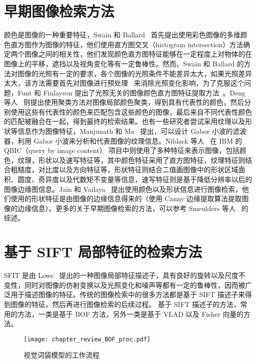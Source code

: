\section{早期图像检索方法}\label{sec:early_work_review}

颜色是图像的一种重要特征，Swain 和 Ballard~\cite{Swain1991ColorI} 首先提出使用彩色图像的多维颜色直方图作为图像的特征，他们使用直方图交叉（histogram intersection）方法确定两个图像之间的相关性，他们发现颜色直方图特征能够在一定程度上对物体的在图像上的平移，遮挡以及视角变化等有一定鲁棒性。然而，Swain 和 Ballard 的方法对图像的光照有一定的要求，各个图像的光照条件不能差异太大，如果光照差异太大，该方法需要首先对图像进行预处理~\cite{Forsyth1990ANA} 来消除光照变化影响，为了克服这个问题，Funt 和 Finlayson 提出了光照无关的图像颜色直方图特征提取方法~\cite{Funt1995ColorCC}。Deng 等人~\cite{Deng2001AnEC} 则提出使用聚类方法对图像局部颜色聚类，得到具有代表性的颜色，然后分别使用这些有代表性的颜色来匹配包含这些颜色的图像，最后来自不同代表性颜色的匹配被融合在一起，得到最终的检索结果。也有一些研究者尝试采用纹理以及形状等信息作为图像特征，Manjunath 和 Ma~\cite{Manjunath1996TextureFF} 提出，可以设计 Gabor 小波的滤波器，利用 Gabor 小波来分析和代表图像的纹理信息。Niblack 等人~\cite{Niblack1993TheQP} 在 IBM 的 QBIC（query by image content） 项目中则使用了多种特征来表示图像，包括颜色，纹理，形状以及速写特征等，其中颜色特征采用了直方图特征，纹理特征则结合粗糙度，对比度以及方向特征等，形状特征则结合二值画图像中的形状区域面积、圆度、奇异度以及代数矩不变量等信息，速写特征则是基于降低分辨率以后的图像边缘图信息。Jain 和 Vailaya~\cite{Jain1996ImageRU} 提出使用颜色以及形状信息进行图像检索，他们使用的形状特征是由图像的边缘信息得来的（使用 Canny 边缘提取算法提取图像的边缘信息）。更多的关于早期图像检索的方法，可以参考 Smeulders 等人~\cite{Smeulders2000ContentBasedIR} 的综述。


\section{基于 SIFT 局部特征的检索方法}\label{sec:sift_based_method_review}

SFIT 是由 Lowe~\cite{Lowe2004DistinctiveIF} 提出的一种图像局部特征描述子，具有良好的旋转以及尺度不变性，同时对图像的仿射变换以及光照变化和噪声等都有一定的鲁棒性，因而被广泛用于描述图像的特征。传统的图像检索中的很多方法都是基于 SIFT 描述子来得到图像的特征，然后再进行图像检索的后续过程。 基于 SIFT 描述子的方法，常用的方法，一类是基于 BOF 方法，另外一类是基于 VLAD 以及 Fisher 向量的方法。

\begin{figure}[!t]
\centering
\texttt{[image: chapter\_review\_BOF\_proc.pdf]}
\caption{视觉词袋模型的工作流程}
\label{fig:bof_process}
\end{figure}

